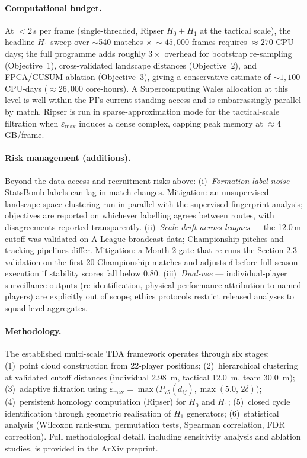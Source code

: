 \paragraph{Computational budget.}
At ${<}2$\,s per frame (single-threaded, Ripser $H_0{+}H_1$ at the tactical scale), the headline $H_1$ sweep over $\sim$540 matches $\times\,{\sim}45{,}000$ frames requires $\approx 270$ CPU-days; the full programme adds roughly $3\times$ overhead for bootstrap re-sampling (Objective~1), cross-validated landscape distances (Objective~2), and FPCA/CUSUM ablation (Objective~3), giving a conservative estimate of ${\sim}1{,}100$ CPU-days ($\approx 26{,}000$ core-hours). A Supercomputing Wales allocation at this level is well within the PI's current standing access and is embarrassingly parallel by match. Ripser is run in sparse-approximation mode for the tactical-scale filtration when $\varepsilon_{\max}$ induces a dense complex, capping peak memory at ${\approx}4$\,GB/frame.

\paragraph{Risk management (additions).}
Beyond the data-access and recruitment risks above: (i)~\textit{Formation-label noise} --- StatsBomb labels can lag in-match changes. Mitigation: an unsupervised landscape-space clustering run in parallel with the supervised fingerprint analysis; objectives are reported on whichever labelling agrees between routes, with disagreements reported transparently. (ii)~\textit{Scale-drift across leagues} --- the 12.0\,m cutoff was validated on A-League broadcast data; Championship pitches and tracking pipelines differ. Mitigation: a Month-2 gate that re-runs the Section-2.3 validation on the first 20 Championship matches and adjusts $\delta$ before full-season execution if stability scores fall below 0.80. (iii)~\textit{Dual-use} --- individual-player surveillance outputs (re-identification, physical-performance attribution to named players) are explicitly out of scope; ethics protocols restrict released analyses to squad-level aggregates.

\paragraph{Methodology.}
The established multi-scale TDA framework \citep{Brown2026} operates through six stages: (1)~point cloud construction from 22-player positions; (2)~hierarchical clustering at validated cutoff distances (individual 2.98~m, tactical 12.0~m, team 30.0~m); (3)~adaptive filtration using $\varepsilon_{\max} = \max\bigl(P_{75}(d_{ij}), \max(5.0,\, 2\delta)\bigr)$; (4)~persistent homology computation (Ripser) for $H_0$ and $H_1$; (5)~closed cycle identification through geometric realisation of $H_1$ generators; (6)~statistical analysis (Wilcoxon rank-sum, permutation tests, Spearman correlation, FDR correction). Full methodological detail, including sensitivity analysis and ablation studies, is provided in the ArXiv preprint.

